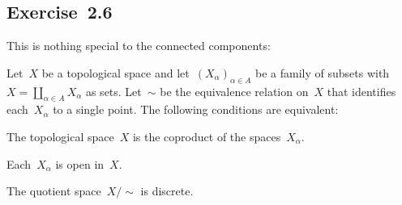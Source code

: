 \subsection{Exercise~2.6}
\label{exercise 2.6}

This is nothing special to the connected components:

\begin{proposition}
	Let~$X$ be a topological space and let~$(X_α)_{α ∈ A}$ be a family of subsets with~$X = ∐_{α ∈ A} X_α$ as sets.
	Let~$∼$ be the equivalence relation on~$X$ that identifies each~$X_α$ to a single point.
	The following conditions are equivalent:
	\begin{equivalenceslist}

		\item
			\label{is coproduct}
			The topological space~$X$ is the coproduct of the spaces~$X_α$.

		\item
			\label{each subspace is open}
			Each~$X_α$ is open in~$X$.

		\item
			\label{quotient space is discrete}
			The quotient space~$X / {∼}$ is discrete.

	\end{equivalenceslist}
\end{proposition}


